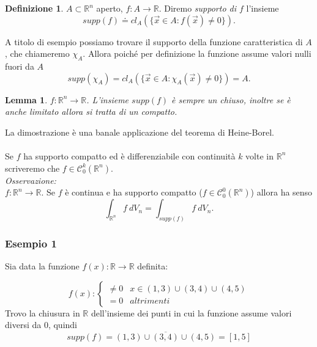 \documentclass[10pt]{article}
\theoremstyle{plain}
\newtheorem{lem}[thm]{Lemma}
\theoremstyle{definition}
\newtheorem{defn}{Definizione}
\begin{document}
\begin{defn}
$A\subset \mathbb{R}^n$ aperto, $f:A\to \mathbb{R}$. Diremo \textit{supporto di $f$} l'insieme
$$supp (f)\doteq cl_A ( \{ \vec{x} \in A: f(\vec{x})\neq 0 \}) .$$
\end{defn}

A titolo di esempio possiamo trovare il supporto della funzione caratteristica di $A$, che chiameremo $\chi_A$. 
Allora poiché per definizione la funzione assume valori nulli fuori da $A$
$$supp( \chi_A) = cl_A (\{ \vec{x} \in A: \chi_A(\vec{x})\neq 0 \}) = A.$$

\begin{lem}
$f:\mathbb{R}^n\to \mathbb{R}$. L'insieme $supp(f)$ è sempre un chiuso, inoltre se è anche limitato allora si tratta di un compatto.
\end{lem}
La dimostrazione è una banale applicazione del teorema di Heine-Borel.
\\
\\ Se $f$ ha supporto compatto ed è differenziabile con continuità $k$ volte in $\mathbb{R}^n$ scriveremo che $f\in \mathcal{C}_0^k (\mathbb{R}^n).$
\\
\textit{Osservazione:}
\\
$f:\mathbb{R}^n\to \mathbb{R}$. Se $f$ è continua e ha supporto compatto ($f\in \mathcal{C}_0^0 (\mathbb{R}^n)$) allora ha senso
$$\int_{\mathbb{R}^n} f\ dV_n = \int_{supp(f)} f\ dV_n. $$


\subsubsection{Esempio 1}
Sia data la funzione $f(x):\mathbb{R} \to \mathbb{R}$ definita:

$$f(x):
\begin{cases}
 \neq 0 & x \in (1,3) \cup (3,4) \cup (4,5) \\
 =0 & altrimenti
\end{cases}$$
Trovo la chiusura in $\mathbb{R}$ dell'insieme dei punti in cui la funzione assume valori diversi da $0$, quindi 
$$supp (f) = \overline{(1,3) \cup (3,4) \cup (4,5)} = [1,5] $$

\end{document}
